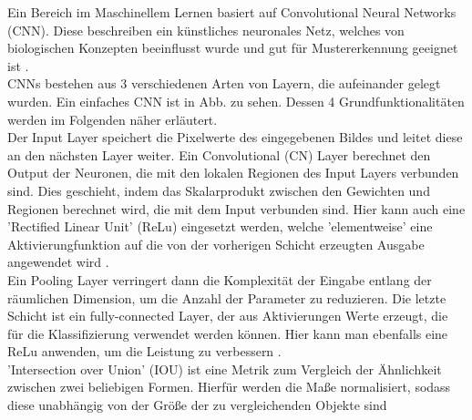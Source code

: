 {{	Ein Bereich im Maschinellem Lernen basiert auf Convolutional Neural Networks (CNN). Diese beschreiben ein künstliches neuronales Netz, welches von biologischen Konzepten beeinflusst wurde und gut für Mustererkennung geeignet ist \citep{Matsugu2003}. \\
	CNNs bestehen aus 3 verschiedenen Arten von Layern, die aufeinander gelegt wurden. Ein einfaches CNN ist in Abb.  zu sehen. Dessen 4 Grundfunktionalitäten werden im Folgenden näher erläutert. \\
	Der Input Layer speichert die Pixelwerte des eingegebenen Bildes und leitet diese an den nächsten Layer weiter. Ein Convolutional (CN) Layer berechnet den Output der Neuronen, die mit den lokalen Regionen des Input Layers verbunden sind. Dies geschieht, indem das Skalarprodukt zwischen den Gewichten und Regionen berechnet wird, die mit dem Input verbunden sind. Hier kann auch eine 'Rectified Linear Unit' (ReLu) eingesetzt werden, welche 'elementweise' eine Aktivierungfunktion auf die von der vorherigen Schicht erzeugten Ausgabe angewendet wird \citep{OSheaRyan2022}. \\
	Ein Pooling Layer verringert dann die Komplexität der Eingabe entlang der räumlichen Dimension, um die Anzahl der Parameter zu reduzieren. Die letzte Schicht ist ein fully-connected Layer, der aus Aktivierungen Werte erzeugt, die für die Klassifizierung verwendet werden können. Hier kann man ebenfalls eine ReLu anwenden, um die Leistung zu verbessern \citep{OSheaRyan2022}. \\

	
	

	'Intersection over Union' (IOU) ist eine Metrik zum Vergleich der Ähnlichkeit zwischen zwei beliebigen Formen. Hierfür werden die Maße normalisiert, sodass diese unabhängig von der Größe der zu vergleichenden Objekte sind \citep{Rezatofighi2019}  \\



}}
